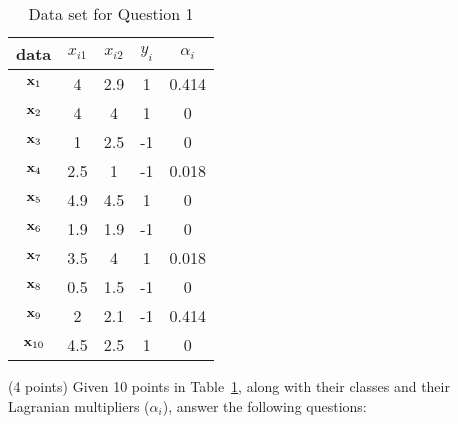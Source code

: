 \documentclass{exam}
\newcommand{\xx}{{\bf{x}}}
\begin{document}
\begin{questions}

\begin{table}[h]
	\centering
	\caption{Data set for Question 1}\label{data-q1}
	\begin{tabular}{c|c|c|c|c}
		\hline
		data & $x_{i1}$ & $x_{i2}$ & $y_i$ & $\alpha_i$\\
			\hline
		$\xx_1$ & 4 & 2.9 & 1 & 0.414 \\
			$\xx_2$ & 4 &4 & 1 & 0 \\
				$\xx_3$ & 1 & 2.5 & -1 & 0\\
					$\xx_4$ & 2.5 & 1& -1 & 0.018 \\
						$\xx_5$ & 4.9 & 4.5& 1 & 0 \\
							$\xx_6$ & 1.9 & 1.9 & -1 & 0\\
								$\xx_7$ &3.5 & 4 & 1 & 0.018 \\
									$\xx_8$ & 0.5 & 1.5 & -1 & 0 \\
										$\xx_9$ & 2 & 2.1 & -1 & 0.414 \\
											$\xx_{10}$ & 4.5& 2.5& 1 & 0\\
			\hline
\end{tabular}
\end{table}
\label{q1} (4 points) Given 10 points in Table~\ref{data-q1}, along with their classes and their Lagranian multipliers ($\alpha_i$), answer the following questions:




\end{questions}
\end{document}
